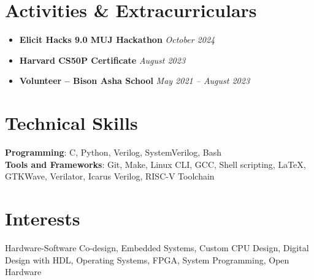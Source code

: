 \documentclass[letterpaper,11pt]{article}
\begin{document}
\section{Activities \& Extracurriculars}
\begin{itemize}[leftmargin=*, itemsep=1pt]
  \item \textbf{Elicit Hacks 9.0 MUJ Hackathon} \hfill \textit{October 2024}
  \item \textbf{Harvard CS50P Certificate} \hfill \textit{August 2023}
  \item \textbf{Volunteer – Bison Asha School} \hfill \textit{May 2021 -- August 2023}
\end{itemize}

\section{Technical Skills}
\begin{itemize}[leftmargin=0.15in, label={}]
  \small{\item{
    \textbf{Programming}{: C, Python, Verilog, SystemVerilog, Bash} \\
    \textbf{Tools and Frameworks}{: Git, Make, Linux CLI, GCC, Shell scripting, LaTeX, GTKWave, Verilator, Icarus Verilog, RISC-V Toolchain}
  }}
\end{itemize}

\section{Interests}
\begin{itemize}[leftmargin=0.15in, label={}]
  \small{\item{
    Hardware-Software Co-design, Embedded Systems, Custom CPU Design, Digital Design with HDL, Operating Systems, FPGA, System Programming, Open Hardware
  }}
\end{itemize}
\end{document}
